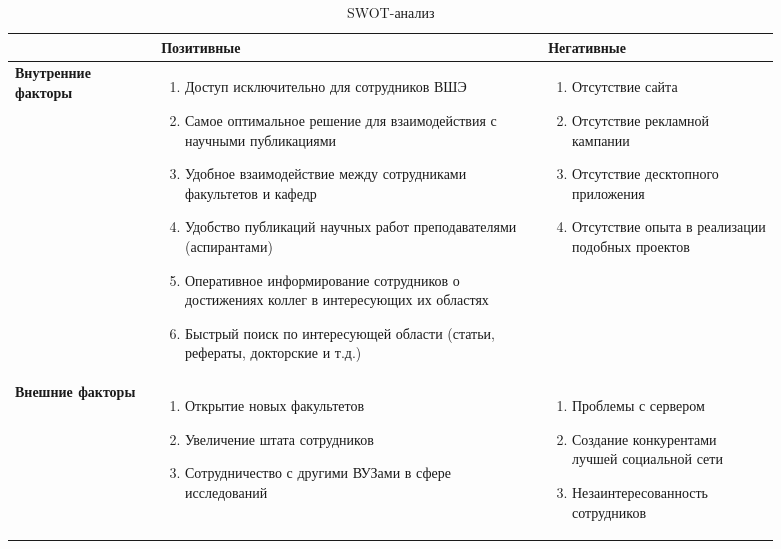 \begin{longtable}{|p{0.17\linewidth}|p{0.45\linewidth}|p{0.27\linewidth}|}
	\caption{SWOT-анализ} \label{swot} \\
    \hline 
    &  Позитивные& Негативные \\ 
    \hline 
    \textbf{Внутренние факторы}& {\footnotesize
       \begin{enumerate}
           \item Доступ исключительно для сотрудников ВШЭ
           \item Самое оптимальное решение для взаимодействия с научными публикациями
           \item Удобное взаимодействие между сотрудниками факультетов и кафедр
           \item Удобство публикаций научных работ преподавателями (аспирантами)
           \item Оперативное информирование сотрудников о достижениях коллег в интересующих их областях
           \item Быстрый поиск по интересующей области (статьи, рефераты, докторские и т.д.)
       \end{enumerate}
     }& {\footnotesize
       \begin{enumerate}
           \item Отсутствие сайта
           \item Отсутствие рекламной кампании
           \item Отсутствие десктопного приложения
           \item Отсутствие опыта в реализации подобных проектов
       \end{enumerate}
     } \\ 
    \hline 
    \textbf{Внешние факторы}& {\footnotesize
       \begin{enumerate}
           \item Открытие новых факультетов
           \item Увеличение штата сотрудников
           \item Сотрудничество с другими ВУЗами в сфере исследований
       \end{enumerate}
     }  & {\footnotesize
       \begin{enumerate}
           \item Проблемы с сервером
           \item Создание конкурентами лучшей социальной сети
           \item Незаинтересованность сотрудников
       \end{enumerate}
     } \\ 
    \hline 
\end{longtable} 